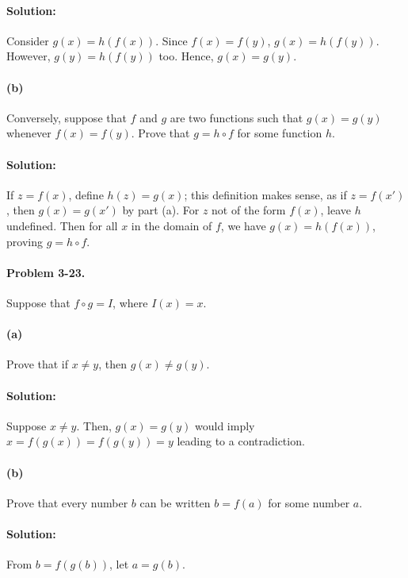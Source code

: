 \documentclass{article}
\begin{document}
\paragraph{Solution:} Consider $g(x) = h(f(x))$. Since $f(x) = f(y)$, $g(x) =
h(f(y))$. However, $g(y) = h(f(y))$ too. Hence, $g(x) = g(y)$.

\paragraph{(b)} Conversely, suppose that $f$ and $g$ are two functions such
that $g(x) = g(y)$ whenever $f(x) = f(y)$. Prove that $g = h \circ f$ for some
function $h$.

\paragraph{Solution:} If $z = f(x)$, define $h(z) = g(x)$; this definition
makes sense, as if $z = f(x')$, then $g(x) = g(x')$ by part (a). For $z$ not of
the form $f(x)$, leave $h$ undefined. Then for all $x$ in the domain of $f$, we
have $g(x) = h(f(x))$, proving $g = h \circ f$.

\paragraph{Problem 3-23.} Suppose that $f \circ g = I$, where $I(x) = x$.

\paragraph{(a)} Prove that if $x \neq y$, then $g(x) \neq g(y)$.

\paragraph{Solution:} Suppose $x \neq y$. Then, $g(x) = g(y)$ would imply $x =
f(g(x)) = f(g(y)) = y$ leading to a contradiction.

\paragraph{(b)} Prove that every number $b$ can be written $b = f(a)$ for some
number $a$.

\paragraph{Solution:} From $b = f(g(b))$, let $a = g(b)$.
\end{document}
